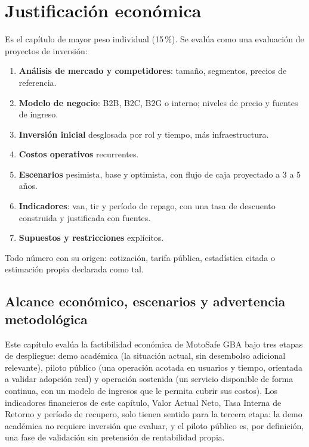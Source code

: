 
\chapter{Justificación económica}\label{cap:economica}

\begin{guia}
Es el capítulo de mayor peso individual (15\,\%). Se evalúa como una
evaluación de proyectos de inversión:
\begin{enumerate}
    \item \textbf{Análisis de mercado y competidores}: tamaño, segmentos,
          precios de referencia.
    \item \textbf{Modelo de negocio}: B2B, B2C, B2G o interno; niveles de
          precio y fuentes de ingreso.
    \item \textbf{Inversión inicial} desglosada por rol y tiempo, más
          infraestructura.
    \item \textbf{Costos operativos} recurrentes.
    \item \textbf{Escenarios} pesimista, base y optimista, con flujo de caja
          proyectado a 3 a 5 años.
    \item \textbf{Indicadores}: \gls{van}, \gls{tir} y período de repago,
          con una tasa de descuento construida y justificada con fuentes.
    \item \textbf{Supuestos y restricciones} explícitos.
\end{enumerate}
Todo número con su origen: cotización, tarifa pública, estadística
citada o estimación propia declarada como tal.
\end{guia}

\section{Alcance económico, escenarios y advertencia metodológica}

Este capítulo evalúa la factibilidad económica de MotoSafe GBA bajo tres
etapas de despliegue: demo académica (la situación actual, sin
desembolso adicional relevante), piloto público (una operación acotada
en usuarios y tiempo, orientada a validar adopción real) y operación
sostenida (un servicio disponible de forma continua, con un modelo de
ingresos que le permita cubrir sus costos). Los indicadores financieros
de este capítulo, Valor Actual Neto, Tasa Interna de Retorno y período
de recupero, solo tienen sentido para la tercera etapa: la demo
académica no requiere inversión que evaluar, y el piloto público es, por
definición, una fase de validación sin pretensión de rentabilidad
propia.


